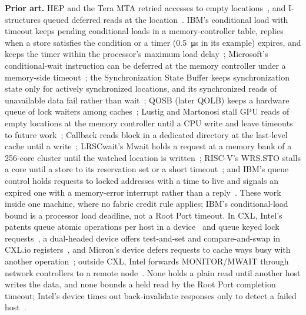 \documentclass[journal]{IEEEtran}
\begin{document}
\textbf{Prior art.}\label{sec:prior} HEP and the Tera MTA retried accesses to
empty locations~\cite{tera}, and I-structures queued deferred reads at the
location~\cite{istructures}. IBM's conditional load with timeout keeps pending conditional loads in
a memory-controller table, replies when a store satisfies the condition or a timer
(\SI{0.5}{\micro\second} in its example) expires, and keeps the timer within the processor's
maximum load delay~\cite{ibmclt}; Microsoft's conditional-wait instruction can be deferred at the
memory controller under a memory-side timeout~\cite{msftcond}; the Synchronization State Buffer
keeps synchronization state only for actively synchronized locations, and its synchronized reads
of unavailable data fail rather than wait~\cite{ssb}; QOSB (later QOLB) keeps a hardware queue of
lock waiters among caches~\cite{qolb}; Lustig and Martonosi stall GPU reads
of empty locations at the memory controller until a CPU write and leave timeouts to future
work~\cite{lustig}; Callback reads block in a dedicated directory at the last-level cache until a
write~\cite{callback}; LRSCwait's Mwait holds a request at a memory bank of a 256-core cluster until
the watched location is written~\cite{lrscwait}; RISC-V's WRS.STO stalls a core until a store to its
reservation set or a short timeout~\cite{zawrs}; and IBM's queue control holds requests to locked
addresses with a time to live and signals an expired one with a memory-error interrupt rather than
a reply~\cite{ibmqueue}. These work inside one machine, where no fabric credit rule applies; IBM's
conditional-load bound is a processor load deadline, not a Root Port timeout. In CXL, Intel's patents queue atomic
operations per host in a device~\cite{intelq} and queue keyed lock requests~\cite{intellock}, a
dual-headed device offers test-and-set and compare-and-swap in CXL.io registers~\cite{amdshare}, and
Micron's device defers requests to cache ways busy with another operation~\cite{micron}; outside
CXL, Intel forwards MONITOR/MWAIT through network controllers to a remote node~\cite{intelmwait}.
None holds a plain read until another host writes the data, and none bounds a held read by the
Root Port completion timeout; Intel's device times out back-invalidate responses only to detect a
failed host~\cite{intelq}.
\end{document}
